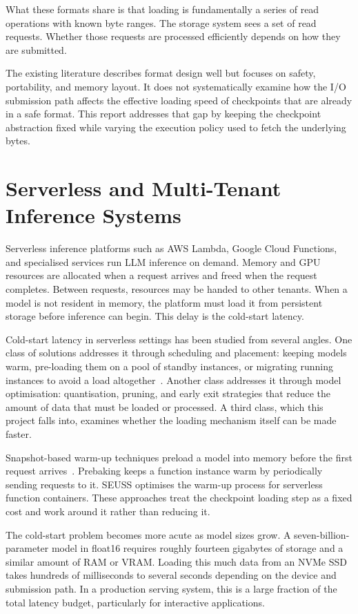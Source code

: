 What these formats share is that loading is fundamentally a series of read operations with known byte ranges. The storage system sees a set of read requests. Whether those requests are processed efficiently depends on how they are submitted.

The existing literature describes format design well but focuses on safety, portability, and memory layout. It does not systematically examine how the I/O submission path affects the effective loading speed of checkpoints that are already in a safe format. This report addresses that gap by keeping the checkpoint abstraction fixed while varying the execution policy used to fetch the underlying bytes.

\section{Serverless and Multi-Tenant Inference Systems}

Serverless inference platforms such as AWS Lambda, Google Cloud Functions, and specialised services run LLM inference on demand. Memory and GPU resources are allocated when a request arrives and freed when the request completes. Between requests, resources may be handed to other tenants. When a model is not resident in memory, the platform must load it from persistent storage before inference can begin. This delay is the cold-start latency.

Cold-start latency in serverless settings has been studied from several angles. One class of solutions addresses it through scheduling and placement: keeping models warm, pre-loading them on a pool of standby instances, or migrating running instances to avoid a load altogether~\cite{FU:2024,serverlessllm_repo}. Another class addresses it through model optimisation: quantisation, pruning, and early exit strategies that reduce the amount of data that must be loaded or processed. A third class, which this project falls into, examines whether the loading mechanism itself can be made faster.

Snapshot-based warm-up techniques preload a model into memory before the first request arrives~\cite{silva2021snapshot}. Prebaking keeps a function instance warm by periodically sending requests to it. SEUSS optimises the warm-up process for serverless function containers. These approaches treat the checkpoint loading step as a fixed cost and work around it rather than reducing it.

The cold-start problem becomes more acute as model sizes grow. A seven-billion-parameter model in float16 requires roughly fourteen gigabytes of storage and a similar amount of RAM or VRAM. Loading this much data from an NVMe SSD takes hundreds of milliseconds to several seconds depending on the device and submission path. In a production serving system, this is a large fraction of the total latency budget, particularly for interactive applications.

